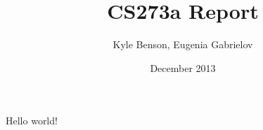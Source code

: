 \documentclass{article}
\title{CS273a Report}
\author{Kyle Benson, Eugenia Gabrielov}
\date{December 2013}
\begin{document}
    \maketitle
    Hello world!
\end{document}
